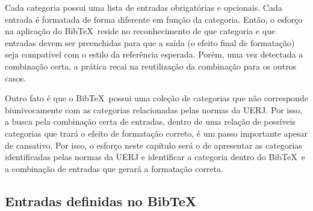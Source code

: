 \documentclass[a4paper,12pt,oneside,onecolumn]{article}
\newcommand{\BibTeX}{{{Bib}}\TeX}
\begin{document}
Cada categoria possui uma lista de entradas obrigatórias e opcionais. Cada entrada é formatada de forma diferente em função da categoria. Então, o esforço na aplicação do \BibTeX\ reside no reconhecimento de que categoria e que entradas devem ser preenchidas para que a saída (o efeito final de formatação) seja compatível com o estilo da referência esperada. Porém, uma vez detectada a combinação certa, a prática recai na reutilização da combinação para os outros casos.

Outro fato é que o \BibTeX\ possui uma coleção de categorias que não corresponde biunivocamente com as categorias relacionadas pelas normas da UERJ. Por isso, a busca pela combinação certa de entradas, dentro de uma relação de possíveis categorias que trará o efeito de formatação correto, é um passo importante apesar de cansativo. Por isso, o esforço neste capítulo será o de apresentar as categorias identificadas pelas normas da UERJ e identificar a categoria dentro do \BibTeX\ e a combinação de entradas que gerará a formatação correta.

\subsection{Entradas definidas no \BibTeX}
\end{document}
